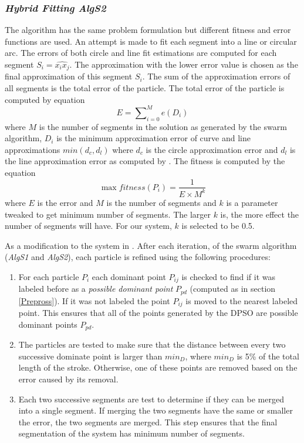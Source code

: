 \documentclass[12pt,1p,times]{elsarticle}%
\begin{document}
 \subsubsection{\textit{Hybrid Fitting \textsl{AlgS2}}}
The algorithm has the same problem formulation but different fitness and error functions are used. An attempt is made to fit each segment into a line or circular arc. The errors of both circle and line fit estimations are computed for each segment $S_i=\widehat{x_ix_j}$. The approximation with the lower error value is chosen as the final approximation of this segment $S_i$\cite{CruveDivisionSwarm}. The sum of the approximation errors of all segments is the total error of the particle.  The total error of the particle is computed by equation %
 \begin{equation}
E=\sum\nolimits_{i = 0}^M e(D_i) 
\label{eq:errorSwarm2}
\end{equation}where $M$ is the number of segments in the solution as generated by the swarm algorithm, $D_i$ is the minimum approximation error of curve and line approximations $min(d_c,d_l)$ where $d_c$ is the circle approximation error and $d_l$ is the line approximation error as computed by \cite{CruveDivisionSwarm}.  The fitness is computed by the equation %
\begin{equation}
\max fitness(P_i ) = \frac{1}{{E \times M^k }}
\label{eq:fitnessSwarm2}
\end{equation} where $E$ is the error and $M$ is the number of segments and $k$ is a parameter tweaked to get minimum number of segments. The larger $k$ is, the more effect the number of segments will have. For our system, $k$ is selected to be 0.5\cite{CruveDivisionSwarm}.

As a modification to the system in \cite{mypaper}. After each iteration, of the swarm algorithm (\textsl{AlgS1} and \textsl{AlgS2}), each particle is refined using the following procedures: 
\begin{enumerate}
	\item For each particle $P_i$ each dominant point $P_{ij}$ is checked to find if it was labeled before as a \textit{possible dominant point} $P_{pd}$ (computed as in section \ref{Prepross}). If it was not labeled the point $P_{ij}$ is moved to the nearest labeled point. This ensures that all of the points generated by the DPSO are possible dominant points $P_{pd}$. 
	\item The particles are tested to make sure that the distance between every two successive dominate point is larger than $min_D$, where $min_D$ is 5\% of the total length of the stroke.  Otherwise, one of these points are removed based on the error caused by its removal.
	\item Each two successive segments are test to determine if they can be merged into a single segment. If merging the two segments have the same or smaller the error, the two segments are merged. This step ensures that the final segmentation of the system has minimum number of segments. 
\end{enumerate}
\end{document}
